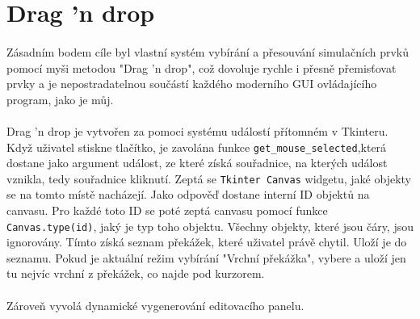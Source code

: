 \documentclass[12pt,a4paper]{report}
\begin{document}
\section{Drag 'n drop}
\paragraph{} Zásadním bodem cíle byl vlastní systém vybírání a přesouvání simulačních prvků pomocí myši metodou "Drag 'n drop", což dovoluje rychle i přesně přemisťovat prvky a je nepostradatelnou součástí každého moderního GUI ovládajícího program, jako je můj.
\paragraph{} Drag 'n drop je vytvořen za pomoci systému událostí přítomném v Tkinteru. Když uživatel stiskne tlačítko, je zavolána funkce \lstinline{get_mouse_selected},\newline která dostane jako argument událost, ze které získá souřadnice, na kterých událost vznikla, tedy souřadnice kliknutí. Zeptá se \lstinline{Tkinter Canvas} widgetu, jaké objekty se na tomto místě nacházejí. Jako odpověď dostane interní ID objektů na canvasu. Pro každé toto ID se poté zeptá canvasu pomocí funkce \lstinline{Canvas.type(id)}, jaký je typ toho objektu. Všechny objekty, které jsou čáry, jsou ignorovány. Tímto získá seznam překážek, které uživatel právě chytil. Uloží je do seznamu. Pokud je aktuální režim vybírání "Vrchní překážka", vybere a uloží jen tu nejvíc vrchní z překážek, co najde pod kurzorem.
\paragraph{} Zároveň vyvolá dynamické vygenerování editovacího panelu.
\end{document}
